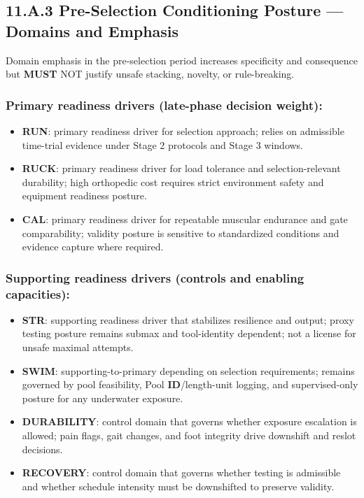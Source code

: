 \documentclass[10pt]{article}
\begin{document}
\newpage

\subsection*{11.A.3 Pre-Selection Conditioning Posture — Domains and Emphasis}
{}

Domain emphasis in the pre-selection period increases specificity and consequence but \textbf{MUST} NOT justify unsafe stacking, novelty, or rule-breaking.

\subsubsection*{Primary readiness drivers (late-phase decision weight):}

\begin{itemize}
\item \textbf{RUN}: primary readiness driver for selection approach; relies on admissible time-trial evidence under Stage 2 protocols and Stage 3 windows.
\item \textbf{RUCK}: primary readiness driver for load tolerance and selection-relevant durability; high orthopedic cost requires strict environment safety and equipment readiness posture.
\item \textbf{CAL}: primary readiness driver for repeatable muscular endurance and gate comparability; validity posture is sensitive to standardized conditions and evidence capture where required.
\end{itemize}

\subsubsection*{Supporting readiness drivers (controls and enabling capacities):}

\begin{itemize}
\item \textbf{STR}: supporting readiness driver that stabilizes resilience and output; proxy testing posture remains submax and tool-identity dependent; not a license for unsafe maximal attempts.
\item \textbf{SWIM}: supporting-to-primary depending on selection requirements; remains governed by pool feasibility, Pool \textbf{ID}/length-unit logging, and supervised-only posture for any underwater exposure.
\item \textbf{DURABILITY}: control domain that governs whether exposure escalation is allowed; pain flags, gait changes, and foot integrity drive downshift and reslot decisions.
\item \textbf{RECOVERY}: control domain that governs whether testing is admissible and whether schedule intensity must be downshifted to preserve validity.
\end{itemize}
\end{document}
